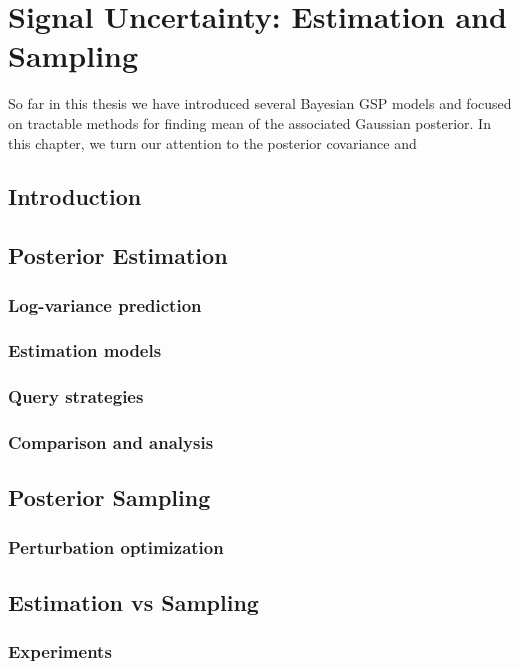 \chapter{Signal Uncertainty: Estimation and Sampling} %

\label{chap:variance} %


So far in this thesis we have introduced several Bayesian GSP models and focused on tractable methods for finding mean of the associated Gaussian posterior. In this chapter, we turn our attention to the posterior covariance and 


\section{Introduction}

\label{sec:var_intro}


\section{Posterior Estimation}

\subsection{Log-variance prediction}

\subsection{Estimation models}

\subsection{Query strategies}

\subsection{Comparison and analysis}


\section{Posterior Sampling}

\label{sec:sampling}

\subsection{Perturbation optimization}



\section{Estimation vs Sampling}

\subsection{Experiments}
